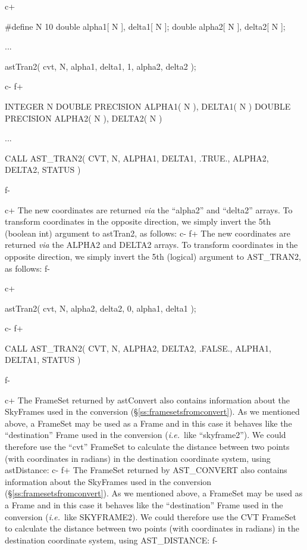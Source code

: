 \documentclass[twoside,11pt]{starlink}
\providecommand{\secref}[1]{\S\ref{#1}}
\begin{document}
c+
\small
\begin{terminalv}
#define N 10
double alpha1[ N ], delta1[ N ];
double alpha2[ N ], delta2[ N ];

...

astTran2( cvt, N, alpha1, delta1, 1, alpha2, delta2 );
\end{terminalv}
\normalsize
c-
f+
\small
\begin{terminalv}
      INTEGER N
      DOUBLE PRECISION ALPHA1( N ), DELTA1( N )
      DOUBLE PRECISION ALPHA2( N ), DELTA2( N )

      ...

      CALL AST_TRAN2( CVT, N, ALPHA1, DELTA1, .TRUE., ALPHA2, DELTA2, STATUS )
\end{terminalv}
\normalsize
f-

c+
The new coordinates are returned \emph{via} the ``alpha2'' and
``delta2'' arrays.  To transform coordinates in the opposite
direction, we simply invert the 5th (boolean int) argument to
astTran2, as follows:
c-
f+
The new coordinates are returned \emph{via} the ALPHA2 and DELTA2
arrays.  To transform coordinates in the opposite direction, we simply
invert the 5th (logical) argument to AST\_TRAN2, as follows:
f-

c+
\small
\begin{terminalv}
astTran2( cvt, N, alpha2, delta2, 0, alpha1, delta1 );
\end{terminalv}
\normalsize
c-
f+
\small
\begin{terminalv}
      CALL AST_TRAN2( CVT, N, ALPHA2, DELTA2, .FALSE., ALPHA1, DELTA1, STATUS )
\end{terminalv}
\normalsize
f-

c+
The FrameSet returned by astConvert also contains information about
the SkyFrames used in the conversion
(\secref{ss:framesetsfromconvert}). As we mentioned above, a FrameSet
may be used as a Frame and in this case it behaves like the
``destination'' Frame used in the conversion (\emph{i.e.}\ like
``skyframe2'').  We could therefore use the ``cvt'' FrameSet to
calculate the distance between two points (with coordinates in
radians) in the destination coordinate system, using astDistance:
c-
f+
The FrameSet returned by AST\_CONVERT also contains information about
the SkyFrames used in the conversion
(\secref{ss:framesetsfromconvert}). As we mentioned above, a FrameSet
may be used as a Frame and in this case it behaves like the
``destination'' Frame used in the conversion (\emph{i.e.}\ like
SKYFRAME2). We could therefore use the CVT FrameSet to calculate the
distance between two points (with coordinates in radians) in the
destination coordinate system, using AST\_DISTANCE:
f-
\end{document}
